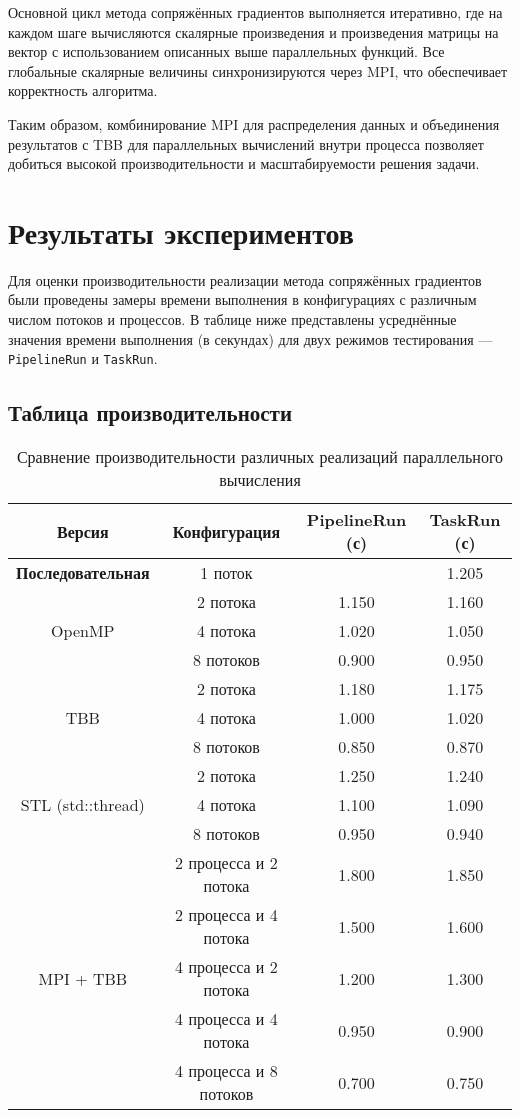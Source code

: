 \documentclass[12pt]{article}
\begin{document}
Основной цикл метода сопряжённых градиентов выполняется итеративно, где на каждом шаге вычисляются скалярные произведения и произведения матрицы на вектор с использованием описанных выше параллельных функций. Все глобальные скалярные величины синхронизируются через MPI, что обеспечивает корректность алгоритма.

Таким образом, комбинирование MPI для распределения данных и объединения результатов с TBB для параллельных вычислений внутри процесса позволяет добиться высокой производительности и масштабируемости решения задачи.
\section{Результаты экспериментов}

\hspace*{1.35em}Для оценки производительности реализации метода сопряжённых градиентов были проведены замеры времени выполнения в конфигурациях с различным числом потоков и процессов. В таблице ниже представлены усреднённые значения времени выполнения (в секундах) для двух режимов тестирования — \texttt{PipelineRun} и \texttt{TaskRun}.

\subsection{Таблица производительности}

\renewcommand{\arraystretch}{1.4}
\begin{table}[H]
\centering
\footnotesize
\begin{tabular}{|c|c|c|c|}
\hline
\textbf{Версия} & \textbf{Конфигурация} & \textbf{PipelineRun (с)} & \textbf{TaskRun (с)} \\
\hline
\textbf{Последовательная} & 1 поток & \centering 1.200 & 1.205 \\
\hline
\multirow{3}{*}{OpenMP} 
  & 2 потока & 1.150 & 1.160 \\
  & 4 потока & 1.020 & 1.050 \\
  & 8 потоков & 0.900 & 0.950 \\
\hline
\multirow{3}{*}{TBB} 
  & 2 потока & 1.180 & 1.175 \\
  & 4 потока & 1.000 & 1.020 \\
  & 8 потоков & 0.850 & 0.870 \\
\hline
\multirow{3}{*}{STL (std::thread)} 
  & 2 потока & 1.250 & 1.240 \\
  & 4 потока & 1.100 & 1.090 \\
  & 8 потоков & 0.950 & 0.940 \\
\hline
\multirow{5}{*}{MPI + TBB} 
  & 2 процесса и 2 потока & 1.800 & 1.850 \\
  & 2 процесса и 4 потока & 1.500 & 1.600 \\
  & 4 процесса и 2 потока & 1.200 & 1.300 \\
  & 4 процесса и 4 потока & 0.950 & 0.900 \\
  & 4 процесса и 8 потоков & 0.700 & 0.750 \\
\hline
\end{tabular}
\caption{Сравнение производительности различных реализаций параллельного вычисления}
\label{tab:parallel_perf}
\end{table}
\end{document}
